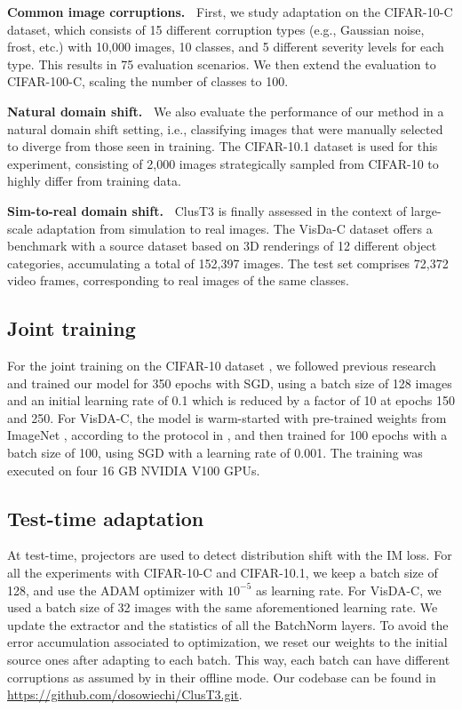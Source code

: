 \documentclass{article}
\newcommand{\mypar}[1]{\vspace{3pt}\noindent\textbf{#1~}}
\begin{document}
\mypar{Common image corruptions.} First, we study adaptation on the CIFAR-10-C \cite{cifar10c} dataset, which consists of 15 different corruption types (e.g., Gaussian noise, frost, etc.) with 10,000 images, 10 classes, and 5 different severity levels for each type. This results in 75 evaluation scenarios. We then extend the evaluation to CIFAR-100-C, scaling the number of classes to 100.

\mypar{Natural domain shift.} We also evaluate the performance of our method in a natural domain shift setting, i.e., classifying images that were manually selected to diverge from those seen in training.  The CIFAR-10.1 dataset \cite{cifar10.1} is used for this experiment, consisting of 2,000 images strategically sampled from CIFAR-10 to highly differ from training data.

\mypar{Sim-to-real domain shift.} ClusT3 is finally assessed in the context of large-scale adaptation from simulation to real images. The VisDa-C dataset \cite{visda} offers a benchmark with a source dataset based on 3D renderings of 12 different object categories, accumulating a total of 152,397 images. The test set comprises 72,372 video frames, corresponding to real images of the same classes.

\subsection{Joint training}

For the joint training on the CIFAR-10 dataset \cite{cifar10}, we followed previous research and trained our model for 350 epochs with SGD, using a batch size of 128 images and an initial learning rate of 0.1 which is reduced by a factor of 10 at epochs 150 and 250. For VisDA-C, the model is warm-started with pre-trained weights from ImageNet \cite{imagenet}, according to the protocol in \cite{tent2021,ttt++,shot2021}, and then trained for 100 epochs with a batch size of 100, using SGD with a learning rate of 0.001. The training was executed on four 16 GB NVIDIA V100 GPUs.

\subsection{Test-time adaptation}

At test-time, projectors are used to detect distribution shift with the IM loss. For all the experiments with CIFAR-10-C and CIFAR-10.1, we keep a batch size of 128, and use the ADAM optimizer with $10^{-5}$ as learning rate. For VisDA-C, we used a batch size of 32 images with the same aforementioned learning rate.
We update the extractor and the statistics of all the BatchNorm layers.
To avoid the error accumulation associated to optimization, we reset our weights to the initial source ones after  adapting to each batch.
This way, each batch can have different corruptions as assumed by \cite{ttt} in their offline mode. Our codebase can be found in \url{https://github.com/dosowiechi/ClusT3.git}.
\end{document}
